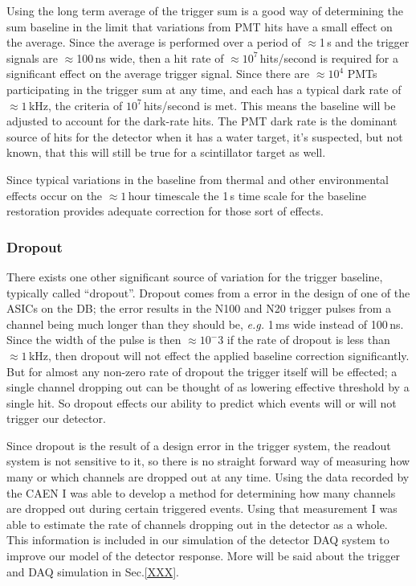 Using the long term average of the trigger sum is a good way of
determining the sum baseline in the limit that variations from
PMT hits have a small effect on the average.
Since the average is performed over a period of $\approx$1\,s
and the trigger signals are $\approx$100\,ns wide, then a hit
rate of $\approx 10^7$\,hits/second is required for a significant
effect on the average trigger signal.
Since there are $\approx10^4$ PMTs participating in the trigger sum
at any time, and each has a typical dark rate of $\approx1$\,kHz, the
criteria of $10^7$\,hits/second is met.
This means the baseline will be adjusted to account for the dark-rate hits.
The PMT dark rate is the dominant source of hits for the detector when it has
a water target, it's suspected, but not known, that this will still be true for
a scintillator target as well.

Since typical variations in the baseline from thermal and other environmental
effects occur on the $\approx1$\,hour timescale the 1\,s time scale for the
baseline restoration provides adequate correction for those sort of effects.


\subsubsection{Dropout}
There exists one other significant source of variation for the trigger baseline, typically
called ``dropout''.
Dropout comes from a error in the design of one of the
ASICs on the DB; the error results in the N100 and N20 trigger pulses from
a channel being much longer than they should be, \textit{e.g.} 1\,ms wide
instead of 100\,ns.
Since the width of the pulse is then $\approx10^-3$ if the rate of dropout is
less than $\approx 1$\,kHz, then dropout will not effect the applied baseline
correction significantly.
But for almost any non-zero rate of dropout  the trigger itself will be effected;
a single channel dropping out can be thought of as lowering effective threshold
by a single hit.
So dropout effects our ability to predict which events will or will not
trigger our detector.

Since dropout is the result of a design error in the trigger system, the readout system
is not sensitive to it, so there is no straight forward way of measuring how many
or which channels are dropped out at any time.
Using the data recorded by the CAEN I was able to develop a method for determining
how many channels are dropped out during certain triggered events.
Using that measurement I was able to estimate the rate of channels dropping out
in the detector as a whole.
This information is included in our simulation of the detector DAQ system to improve
our model of the detector response. More will be said about the trigger and DAQ simulation
in Sec.\ref{XXX}.

